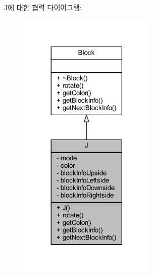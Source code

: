 J에 대한 협력 다이어그램\+:
\nopagebreak
\begin{figure}[H]
\begin{center}
\leavevmode
\includegraphics[width=185pt]{class_j__coll__graph}
\end{center}
\end{figure}
